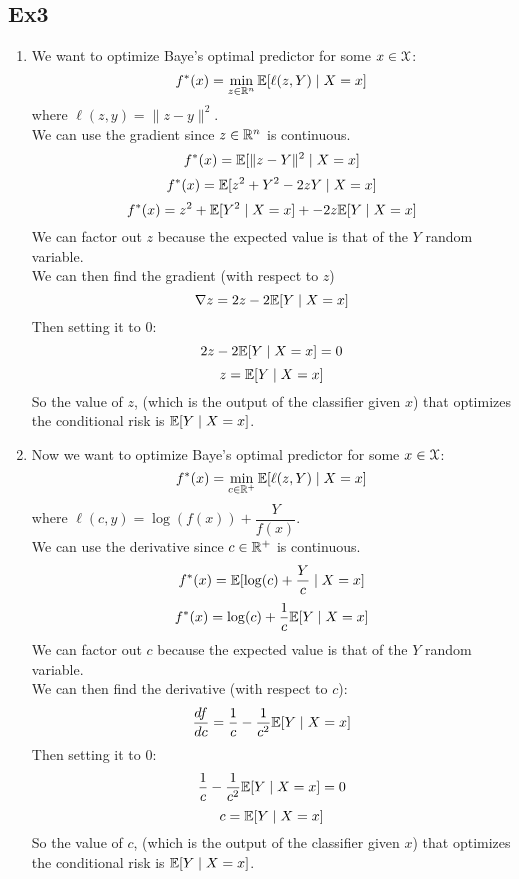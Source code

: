 \documentclass[12pt]{article}
\begin{document}
\newpage

\subsection*{Ex3}

\begin{enumerate}[label=\alph*)]
    \item 
    We want to optimize
    Baye's optimal predictor for
    some $x \in \mathcal{X}$:
    \[ f^*(x) = \min_{z \in \mathbb{R}^n}
    \mathbb{E}[\ell(z, Y) \mid X = x] \]
    where $\ell(z, y) = \| z - y\|^2$. \\
    We can use the gradient
    since $z \in \mathbb{R}^n$ is continuous. \\
    \[ f^*(x)
    = \mathbb{E}[ \| z - Y\|^2 \mid X = x] \]
    \[ f^*(x)
    = \mathbb{E}[z^2 + Y^2 -2zY \mid X = x] \]
    \[ f^*(x)
    = z^2 + \mathbb{E}[Y^2 \mid X = x]
    + -2z\mathbb{E}[Y \mid X = x] \]
    We can factor out $z$ because the expected
    value is that of the $Y$ random variable. \\
    We can then find the gradient
    (with respect to $z$)
    \[ \nabla z = 2z - 2\mathbb{E}[Y \mid X = x] \]
    Then setting it to $0$:
    \[ 2z - 2\mathbb{E}[Y \mid X = x] = 0\]
    \[ z = \mathbb{E}[Y \mid X = x] \]
    So the value of $z$,
    (which is the output of the classifier
    given $x$)
    that optimizes the conditional risk
    is $\mathbb{E}[Y \mid X = x]$.
    \item 
    Now we want to optimize
    Baye's optimal predictor for
    some $x \in \mathcal{X}$:
    \[ f^*(x) = \min_{c \in \mathbb{R}^+}
    \mathbb{E}[\ell(z, Y) \mid X = x] \]
    where $\ell(c, y) = \log(f(x)) + \dfrac{Y}{f(x)}$. \\
    We can use the derivative
    since $c \in \mathbb{R}^+$ is continuous. \\
    \[ f^*(x)
    = \mathbb{E}[ \log(c) + \dfrac{Y}{c} \mid X = x] \]
    \[ f^*(x)
    = \log(c) + \dfrac{1}{c}\mathbb{E}[Y \mid X = x] \]
    We can factor out $c$ because the expected
    value is that of the $Y$ random variable. \\
    We can then find the derivative
    (with respect to $c$):
    \[ \dfrac{df}{dc} = \dfrac{1}{c} - 
    \dfrac{1}{c^2}\mathbb{E}[Y \mid X = x] \]
    Then setting it to $0$:
    \[ \dfrac{1}{c} - 
    \dfrac{1}{c^2}\mathbb{E}[Y \mid X = x] = 0 \]
    \[ c = \mathbb{E}[Y \mid X = x] \]
    So the value of $c$,
    (which is the output of the classifier
    given $x$)
    that optimizes the conditional risk
    is $\mathbb{E}[Y \mid X = x]$.
\end{enumerate}
\end{document}
